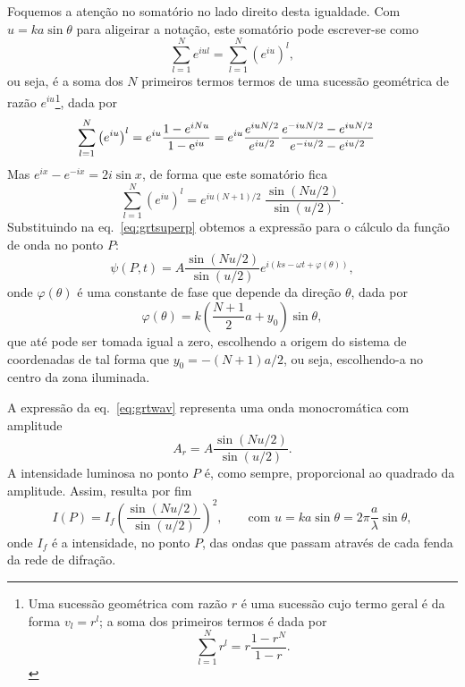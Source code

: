 Foquemos a atenção no somatório no lado direito desta igualdade. Com
$u=ka\sin\theta$ para aligeirar a notação, este somatório pode escrever-se como
\begin{equation*}
  \sum_{l=1}^Ne^{iul} = \sum_{l=1}^N\left(e^{iu}\right)^l,
\end{equation*}
ou seja, é a soma dos $N$ primeiros termos termos de uma sucessão geométrica de
razão $e^{iu}$\footnote{Uma sucessão geométrica com razão $r$ é
  uma sucessão cujo termo geral é da forma $v_l=r^l$; a soma dos primeiros
  termos é dada por
  \begin{equation*}
    \sum_{l=1}^Nr^l=r\frac{1-r^N}{1-r}.
  \end{equation*}
}, dada por
\begin{align*}
  \sum_{l=1}^N\left(e^{iu}\right)^l&=
    e^{iu}\frac{1-e^{iNu}}{1-\text{e}^{iu}}=
    e^{iu}\frac{e^{iuN/2}}{e^{iu/2}}
    \frac{e^{-iuN/2} - e^{iuN/2}}{e^{-iu/2}-e^{iu/2}}
\end{align*}
Mas $e^{ix}-e^{-ix}=2i\sin x$, de forma que este somatório fica
\begin{equation*}
  \sum_{l=1}^N\left(e^{iu}\right)^l=
    e^{iu(N+1)/2}\;\frac{\sin(Nu/2)}{\sin(u/2)}. 
\end{equation*}
Substituindo na eq.~\eqref{eq:grtsuperp} obtemos a expressão para o cálculo da
função de onda no ponto $P$:
\begin{equation}\label{eq:grtwav}
  \psi(P,t)=A\frac{\sin(Nu/2)}{\sin(u/2)} 
    e^{i\left(ks-\omega t+\varphi(\theta)\right)},
\end{equation}
onde $\varphi(\theta)$ é uma constante de fase que depende da direção $\theta$,
dada por
\begin{equation*}
  \varphi(\theta)=k\left(\frac{N+1}{2}a+y_0\right)\sin\theta,
\end{equation*}
que até pode ser tomada igual a zero, escolhendo a origem do sistema de
coordenadas de tal forma que $y_0=-(N+1)a/2$, ou seja, escolhendo-a no centro
da zona iluminada.

A expressão da eq.~\eqref{eq:grtwav} representa uma onda monocromática com
amplitude
\begin{equation}
  A_r=A\frac{\sin(Nu/2)}{\sin(u/2)}.
\end{equation}
A intensidade luminosa no ponto $P$ é, como sempre, proporcional ao quadrado da
amplitude. Assim, resulta por fim
\begin{equation}\label{eq:gratint}
  I(P) = I_f\left(\frac{\sin(Nu/2)}{\sin(u/2)}\right)^2,\qquad\text{com }
  u=ka\sin\theta=2\pi\frac{a}{\lambda}\sin\theta,
\end{equation}
onde $I_f$ é a intensidade, no ponto $P$, das ondas que passam através de cada
fenda da rede de difração.

